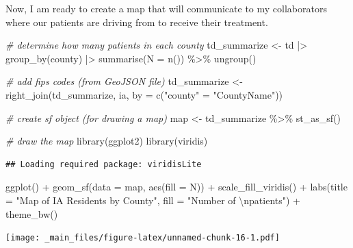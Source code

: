 \documentclass[
]{book}
\newenvironment{Shaded}{\begin{snugshade}}{\end{snugshade}}
\newcommand{\AttributeTok}[1]{\textcolor[rgb]{0.77,0.63,0.00}{#1}}
\newcommand{\CommentTok}[1]{\textcolor[rgb]{0.56,0.35,0.01}{\textit{#1}}}
\newcommand{\FunctionTok}[1]{\textcolor[rgb]{0.00,0.00,0.00}{#1}}
\newcommand{\NormalTok}[1]{#1}
\newcommand{\OtherTok}[1]{\textcolor[rgb]{0.56,0.35,0.01}{#1}}
\newcommand{\SpecialCharTok}[1]{\textcolor[rgb]{0.00,0.00,0.00}{#1}}
\newcommand{\StringTok}[1]{\textcolor[rgb]{0.31,0.60,0.02}{#1}}
\begin{document}
Now, I am ready to create a map that will communicate to my collaborators where our patients are driving from to receive their treatment.

\begin{Shaded}
\begin{Highlighting}[]
\CommentTok{\# determine how many patients in each county}
\NormalTok{td\_summarize }\OtherTok{\textless{}{-}}\NormalTok{ td }\SpecialCharTok{|\textgreater{}}
    \FunctionTok{group\_by}\NormalTok{(county) }\SpecialCharTok{|\textgreater{}}
    \FunctionTok{summarise}\NormalTok{(}\AttributeTok{N =} \FunctionTok{n}\NormalTok{()) }\SpecialCharTok{\%\textgreater{}\%}
  \FunctionTok{ungroup}\NormalTok{()}

\CommentTok{\# add fips codes (from GeoJSON file)}
\NormalTok{td\_summarize }\OtherTok{\textless{}{-}} \FunctionTok{right\_join}\NormalTok{(td\_summarize, ia,}
            \AttributeTok{by =} \FunctionTok{c}\NormalTok{(}\StringTok{"county"} \OtherTok{=} \StringTok{"CountyName"}\NormalTok{)) }

\CommentTok{\# create sf object (for drawing a map)}
\NormalTok{map }\OtherTok{\textless{}{-}}\NormalTok{ td\_summarize }\SpecialCharTok{\%\textgreater{}\%}
  \FunctionTok{st\_as\_sf}\NormalTok{()}

\CommentTok{\# draw the map }
\FunctionTok{library}\NormalTok{(ggplot2)}
\FunctionTok{library}\NormalTok{(viridis)}
\end{Highlighting}
\end{Shaded}

\begin{verbatim}
## Loading required package: viridisLite
\end{verbatim}

\begin{Shaded}
\begin{Highlighting}[]
\FunctionTok{ggplot}\NormalTok{() }\SpecialCharTok{+} 
  \FunctionTok{geom\_sf}\NormalTok{(}\AttributeTok{data =}\NormalTok{ map,}
          \FunctionTok{aes}\NormalTok{(}\AttributeTok{fill =}\NormalTok{ N)) }\SpecialCharTok{+} 
  \FunctionTok{scale\_fill\_viridis}\NormalTok{() }\SpecialCharTok{+} 
  \FunctionTok{labs}\NormalTok{(}\AttributeTok{title =} \StringTok{"Map of IA Residents by County"}\NormalTok{, }\AttributeTok{fill =} \StringTok{"Number of }\SpecialCharTok{\textbackslash{}n}\StringTok{patients"}\NormalTok{) }\SpecialCharTok{+}
  \FunctionTok{theme\_bw}\NormalTok{() }
\end{Highlighting}
\end{Shaded}

\texttt{[image: \_main\_files/figure-latex/unnamed-chunk-16-1.pdf]}

  
\end{document}
